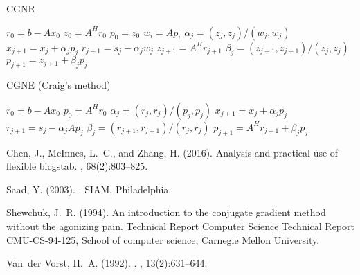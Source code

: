 \documentclass[10pt]{article}
\begin{document}
\begin{algorithm}[H]
  \caption{CGNR \citep[algorithm 8.4]{Saad_2003_IMS}}
  \begin{algorithmic}[1]
    \State $r_0=b-Ax_0$
    \State $z_0 = A^H r_0$
    \State $p_0=z_0$
    \State $w_i=Ap_i$
    \State $\alpha_j = (z_j,z_j)/(w_j,w_j)$
    \State $x_{j+1} = x_j + \alpha_j  p_j$
    \State $r_{j+1}=s_j-\alpha_j w_j$
    \State $z_{j+1}=A^H r_{j+1}$
    \State $\beta_j = (z_{j+1},z_{j+1})/(z_j,z_j)$
    \State $p_{j+1}=z_{j+1}+\beta_jp_j$
    \EndFor
  \end{algorithmic}
\end{algorithm}

\begin{algorithm}[H]
  \caption{CGNE (Craig's method) \citep[algorithm 8.5]{Saad_2003_IMS}}
  \begin{algorithmic}[1]
    \State $r_0=b-Ax_0$
    \State $p_0 = A^H r_0$
    \State $\alpha_j = (r_j , r_j)/(p_j, p_j )$
    \State $x_{j+1} = x_j + \alpha_j  p_j$
    \State $r_{j+1}=s_j-\alpha_j Ap_j$
    \State $\beta_j = (r_{j+1},r_{j+1})/(r_j,r_j)$
    \State $p_{j+1}=A^H r_{j+1}+\beta_jp_j$
    \EndFor
  \end{algorithmic}
\end{algorithm}


\newpage

%
\newcommand{\SortNoop}[1]{}
\begin{thebibliography}{}

Chen, J., McInnes, L.~C., and Zhang, H. (2016).
\newblock Analysis and practical use of flexible bicgstab.
, 68(2):803--825.

Saad, Y. (2003).
.
\newblock SIAM, Philadelphia.

Shewchuk, J.~R. (1994).
\newblock An introduction to the conjugate gradient method without the
  agonizing pain.
\newblock Technical Report Computer Science Technical Report CMU-CS-94-125,
  School of computer science, Carnegie Mellon University.

Van~der Vorst, H.~A. (1992).
.
,
  13(2):631--644.

\end{thebibliography}
\end{document}
